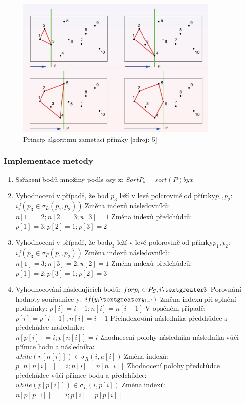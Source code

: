 \documentclass[a4paper, 12pt]{article}
\begin{document}
\begin{figure}[h!]
	\centering
	\includegraphics[width=10cm]{sweep_line.jpg}
	\caption{Princip algoritmu zametací přímky [zdroj: 5]}
\end{figure}

\subsubsection{Implementace metody}
\begin{enumerate}
\item Seřazení bodů množiny podle osy x: $ Sort P_s = sort(P) by x $ 
\item Vyhodnocení v případě, že bod $p_3$ leží v levé polorovině od přímky$ p_1, p_2$:  $ if (p_3 \in \sigma_L (p_1, p_2)) $ 
\subitem Změna indexů následovníků: $ n[1] = 2; n[2] = 3; n[3] = 1  $
\subitem Změna indexů předchůdců: $ p[1] = 3; p[2] = 1; p[3] = 2  $
\item Vyhodnocení v případě, že bod$ p_3$ leží v levé polorovině od přímky$ p_1, p_2$:  $ if (p_3 \in \sigma_P (p_1, p_2)) $ 
\subitem Změna indexů následovníků: $ n[1] = 3; n[3] = 2; n[2] = 1  $
\subitem Změna indexů předchůdců: $ p[1] = 2; p[3] = 1; p[2] = 3  $
\item Vyhodnocování následujících bodů: $ for  p_i \in P_S, i \textgreater 3$
\subitem Porovnání hodnoty souřadnice y: $ if (y_i \textgreater y_{i-1})  $
\subsubitem Změna indexů při splnění podmínky: $ p[i] = i-1; n[i] = n[i-1]$
\subsubitem V opačném případě: $ p[i] = p[i-1]; n[i] = i-1$
\subitem Přeindexování následníka předchůdce a předchůdce následníka: \\
$ n[p[i]] = i; p[n[i]] = i  $
\subitem Zhodnocení polohy následníka následníka vůči přímce bodu a následníka: \\
$ while (n[n[i]]) \in \sigma_R (i, n[i])  $
\subsubitem Změna indexů: $ p[n[n[i]]] = i; n[i] = n[n[i]]$
\subitem Zhodnocení polohy předchůdce předchůdce vůči přímce bodu a předchůdce: \\
$ while (p[p[i]]) \in \sigma_L (i, p[i])  $
\subsubitem Změna indexů: $ n[p[p[i]]] = i; p[i] = p[p[i]]$
\end{enumerate}
\end{document}
